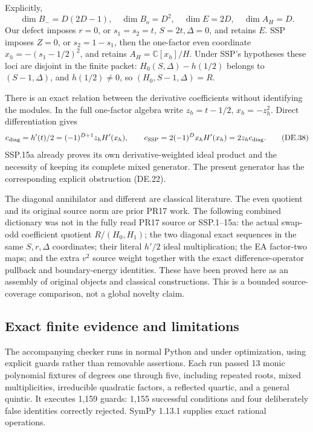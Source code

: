 Explicitly,
\[
 \dim B_-=D(2D-1),\quad\dim B_o=D^2,\quad
 \dim E=2D,\quad\dim A_H=D.
 \tag{DE.37}
\]
Our defect imposes \(r=0\), or \(s_1=s_2=t\), \(S=2t,\Delta=0\), and retains \(E\). SSP imposes \(Z=0\), or \(s_2=1-s_1\), then the one-factor even coordinate \(x_h=-(s_1-1/2)^2\), and retains \(A_H=\mathbb C[x_h]/H\). Under SSP's hypotheses these loci are disjoint in the finite packet: \(H_0(S,\Delta)-h(1/2)\) belongs to \((S-1,\Delta)\), and \(h(1/2)\ne0\), so \((H_0,S-1,\Delta)=R\).

There is an exact relation between the derivative coefficients without identifying the modules. In the full one-factor algebra write \(z_h=t-1/2\), \(x_h=-z_h^2\). Direct differentiation gives
\[
 c_{\rm diag}=h'(t)/2=(-1)^{D+1}z_hH'(x_h),\qquad
 c_{\rm SSP}=2(-1)^Dx_hH'(x_h)=2z_hc_{\rm diag}.
 \tag{DE.38}
\]
SSP.15a already proves its own derivative-weighted ideal product and the necessity of keeping its complete mixed generator. The present generator has the corresponding explicit obstruction (DE.22).

The diagonal annihilator and different are classical literature. The even quotient and its original source norm are prior PR17 work. The following combined dictionary was not in the fully read PR17 source or SSP.1--15a: the actual swap-odd coefficient quotient \(R/(H_0,H_1)\); the two diagonal exact sequences in the same \(S,r,\Delta\) coordinates; their literal \(h'/2\) ideal multiplication; the EA factor-two maps; and the extra \(v^2\) source weight together with the exact difference-operator pullback and boundary-energy identities. These have been proved here as an assembly of original objects and classical constructions. This is a bounded source-coverage comparison, not a global novelty claim.

\subsection{Exact finite evidence and limitations}

The accompanying checker runs in normal Python and under optimization, using explicit guards rather than removable assertions. Each run passed 13 monic polynomial fixtures of degrees one through five, including repeated roots, mixed multiplicities, irreducible quadratic factors, a reflected quartic, and a general quintic. It executes 1,159 guards: 1,155 successful conditions and four deliberately false identities correctly rejected. SymPy 1.13.1 supplies exact rational operations.


